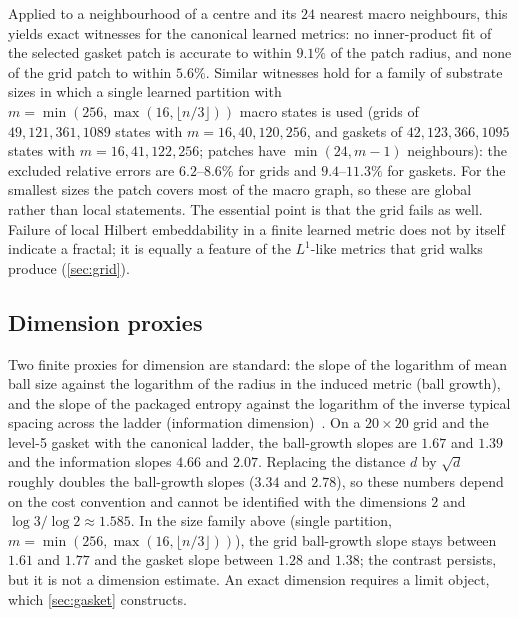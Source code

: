 Applied to a neighbourhood of a centre and its $24$ nearest macro neighbours, this yields exact witnesses for the canonical learned metrics: no inner-product fit of the selected gasket patch is accurate to within $9.1\%$ of the patch radius, and none of the grid patch to within $5.6\%$.
Similar witnesses hold for a family of substrate sizes in which a single learned partition with $m=\min(256,\max(16,\lfloor n/3\rfloor))$ macro states is used (grids of $49,121,361,1089$ states with $m=16,40,120,256$, and gaskets of $42,123,366,1095$ states with $m=16,41,122,256$; patches have $\min(24,m-1)$ neighbours): the excluded relative errors are $6.2$--$8.6\%$ for grids and $9.4$--$11.3\%$ for gaskets. For the smallest sizes the patch covers most of the macro graph, so these are global rather than local statements.
The essential point is that the grid fails as well.
Failure of local Hilbert embeddability in a finite learned metric does not by itself indicate a fractal; it is equally a feature of the $L^1$-like metrics that grid walks produce (\cref{sec:grid}).

\subsection{Dimension proxies}

Two finite proxies for dimension are standard: the slope of the logarithm of mean ball size against the logarithm of the radius in the induced metric (ball growth), and the slope of the packaged entropy against the logarithm of the inverse typical spacing across the ladder (information dimension)~\cite{Renyi1959DimensionEntropy,CoverThomas2006,Falconer2003Fractal}.
On a $20\times20$ grid and the level-5 gasket with the canonical ladder, the ball-growth slopes are $1.67$ and $1.39$ and the information slopes $4.66$ and $2.07$.
Replacing the distance $d$ by $\sqrt d$ roughly doubles the ball-growth slopes ($3.34$ and $2.78$), so these numbers depend on the cost convention and cannot be identified with the dimensions $2$ and $\log3/\log2\approx1.585$.
In the size family above (single partition, $m=\min(256,\max(16,\lfloor n/3\rfloor))$), the grid ball-growth slope stays between $1.61$ and $1.77$ and the gasket slope between $1.28$ and $1.38$; the contrast persists, but it is not a dimension estimate.
An exact dimension requires a limit object, which \cref{sec:gasket} constructs.

